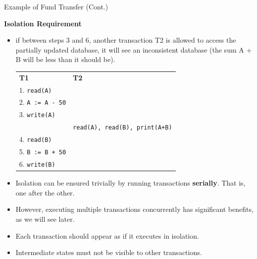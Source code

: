 \documentclass{beamer}
\begin{document}
\begin{frame}{Example of Fund Transfer (Cont.)}

    \scriptsize
    \textbf{Isolation Requirement}
    \begin{itemize}
        \item if between steps 3 and 6, another transaction T2 is allowed to access the partially updated database, it will see an inconsistent database (the sum A + B will be less than it should be).
            \begin{tabular}{l l}
                \textbf{T1}                 & \textbf{T2} \\
                1. \texttt{read(A)}         &       \\
                2. \texttt{A := A - 50}     &       \\
                3. \texttt{write(A)}        &       \\
                                            &   \texttt{read(A), read(B), print(A+B)} \\
                4. \texttt{read(B)}         &       \\
                5. \texttt{B := B + 50}     &       \\
                6. \texttt{write(B)}        &       \\
            \end{tabular}

        \item Isolation can be ensured trivially by running transactions \textbf{serially}.  That is, one after the other.
        \item However, executing multiple transactions concurrently has significant benefits, as we will see later.
        \item Each transaction should appear as if it executes in isolation.
        \item Intermediate states must not be visible to other transactions.

    \end{itemize}
\end{frame}
\end{document}

